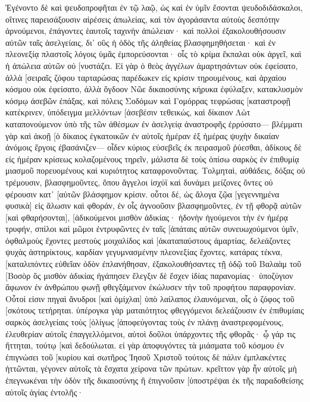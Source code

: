 Ἐγένοντο δὲ καὶ ψευδοπροφῆται ἐν τῷ λαῷ, ὡς καὶ ἐν ὑμῖν ἔσονται ψευδοδιδάσκαλοι, οἵτινες παρεισάξουσιν αἱρέσεις ἀπωλείας, καὶ τὸν ἀγοράσαντα αὐτοὺς δεσπότην ἀρνούμενοι, ἐπάγοντες ἑαυτοῖς ταχινὴν ἀπώλειαν· 
καὶ πολλοὶ ἐξακολουθήσουσιν αὐτῶν ταῖς ἀσελγείαις, δι᾽ οὓς ἡ ὁδὸς τῆς ἀληθείας βλασφημηθήσεται· 
καὶ ἐν πλεονεξίᾳ πλαστοῖς λόγοις ὑμᾶς ἐμπορεύσονται· οἷς τὸ κρίμα ἔκπαλαι οὐκ ἀργεῖ, καὶ ἡ ἀπώλεια αὐτῶν οὐ [νυστάζει. 
Εἰ γὰρ ὁ θεὸς ἀγγέλων ἁμαρτησάντων οὐκ ἐφείσατο, ἀλλὰ [σειραῖς ζόφου ταρταρώσας παρέδωκεν εἰς κρίσιν τηρουμένους, 
καὶ ἀρχαίου κόσμου οὐκ ἐφείσατο, ἀλλὰ ὄγδοον Νῶε δικαιοσύνης κήρυκα ἐφύλαξεν, κατακλυσμὸν κόσμῳ ἀσεβῶν ἐπάξας, 
καὶ πόλεις Σοδόμων καὶ Γομόρρας τεφρώσας [καταστροφῇ κατέκρινεν, ὑπόδειγμα μελλόντων [ἀσεβέσιν τεθεικώς, 
καὶ δίκαιον Λὼτ καταπονούμενον ὑπὸ τῆς τῶν ἀθέσμων ἐν ἀσελγείᾳ ἀναστροφῆς ἐρρύσατο— 
βλέμματι γὰρ καὶ ἀκοῇ [ὁ δίκαιος ἐγκατοικῶν ἐν αὐτοῖς ἡμέραν ἐξ ἡμέρας ψυχὴν δικαίαν ἀνόμοις ἔργοις ἐβασάνιζεν— 
οἶδεν κύριος εὐσεβεῖς ἐκ πειρασμοῦ ῥύεσθαι, ἀδίκους δὲ εἰς ἡμέραν κρίσεως κολαζομένους τηρεῖν, 
μάλιστα δὲ τοὺς ὀπίσω σαρκὸς ἐν ἐπιθυμίᾳ μιασμοῦ πορευομένους καὶ κυριότητος καταφρονοῦντας. Τολμηταὶ, αὐθάδεις, δόξας οὐ τρέμουσιν, βλασφημοῦντες, 
ὅπου ἄγγελοι ἰσχύϊ καὶ δυνάμει μείζονες ὄντες οὐ φέρουσιν κατ᾽ [αὐτῶν βλάσφημον κρίσιν. 
οὗτοι δέ, ὡς ἄλογα ζῷα [γεγεννημένα φυσικὰ] εἰς ἅλωσιν καὶ φθοράν, ἐν οἷς ἀγνοοῦσιν βλασφημοῦντες, ἐν τῇ φθορᾷ αὐτῶν [καὶ φθαρήσονται], 
[ἀδικούμενοι μισθὸν ἀδικίας· ἡδονὴν ἡγούμενοι τὴν ἐν ἡμέρᾳ τρυφήν, σπίλοι καὶ μῶμοι ἐντρυφῶντες ἐν ταῖς [ἀπάταις αὐτῶν συνευωχούμενοι ὑμῖν, 
ὀφθαλμοὺς ἔχοντες μεστοὺς μοιχαλίδος καὶ [ἀκαταπαύστους ἁμαρτίας, δελεάζοντες ψυχὰς ἀστηρίκτους, καρδίαν γεγυμνασμένην πλεονεξίας ἔχοντες, κατάρας τέκνα, 
[καταλιπόντες εὐθεῖαν ὁδὸν ἐπλανήθησαν, ἐξακολουθήσαντες τῇ ὁδῷ τοῦ Βαλαὰμ τοῦ [Βοσὸρ ὃς μισθὸν ἀδικίας ἠγάπησεν 
ἔλεγξιν δὲ ἔσχεν ἰδίας παρανομίας· ὑποζύγιον ἄφωνον ἐν ἀνθρώπου φωνῇ φθεγξάμενον ἐκώλυσεν τὴν τοῦ προφήτου παραφρονίαν. 
Οὗτοί εἰσιν πηγαὶ ἄνυδροι [καὶ ὁμίχλαι] ὑπὸ λαίλαπος ἐλαυνόμεναι, οἷς ὁ ζόφος τοῦ [σκότους τετήρηται. 
ὑπέρογκα γὰρ ματαιότητος φθεγγόμενοι δελεάζουσιν ἐν ἐπιθυμίαις σαρκὸς ἀσελγείαις τοὺς [ὀλίγως [ἀποφεύγοντας τοὺς ἐν πλάνῃ ἀναστρεφομένους, 
ἐλευθερίαν αὐτοῖς ἐπαγγελλόμενοι, αὐτοὶ δοῦλοι ὑπάρχοντες τῆς φθορᾶς· ᾧ γάρ τις ἥττηται, τούτῳ [καὶ δεδούλωται. 
εἰ γὰρ ἀποφυγόντες τὰ μιάσματα τοῦ κόσμου ἐν ἐπιγνώσει τοῦ [κυρίου καὶ σωτῆρος Ἰησοῦ Χριστοῦ τούτοις δὲ πάλιν ἐμπλακέντες ἡττῶνται, γέγονεν αὐτοῖς τὰ ἔσχατα χείρονα τῶν πρώτων. 
κρεῖττον γὰρ ἦν αὐτοῖς μὴ ἐπεγνωκέναι τὴν ὁδὸν τῆς δικαιοσύνης ἢ ἐπιγνοῦσιν [ὑποστρέψαι ἐκ τῆς παραδοθείσης αὐτοῖς ἁγίας ἐντολῆς· 
